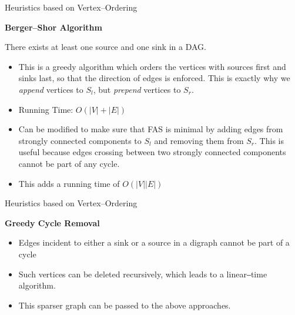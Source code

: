 \documentclass{beamer}
\begin{document}
\begin{frame}{Heuristics based on Vertex–Ordering}
    
    \textbf{Berger–Shor Algorithm}

    \begin{theorem}
        
        There exists at least one source and one sink in a DAG.

    \end{theorem}

    \begin{itemize}
        
        \item This is a greedy algorithm which orders the vertices with sources first and sinks last, so that the direction of edges is enforced. This is exactly why we \textit{append} vertices to $S_l$, but \textit{prepend} vertices to $S_r$.
        \item Running Time: $O(|V| + |E|)$
        \item Can be modified to make sure that FAS is minimal by adding edges from strongly connected components to $S_l$ and removing them from $S_r$. This is useful because edges crossing between two strongly connected components cannot be part of any cycle.
        \item This adds a running time of $O(|V||E|)$

    \end{itemize}

\end{frame}


\begin{frame}{Heuristics based on Vertex–Ordering}

    \textbf{Greedy Cycle Removal}

    \begin{itemize}
        
        \item Edges incident to either a sink or a source in a digraph cannot be part of a cycle

        \item Such vertices can be deleted recursively, which leads to a linear‒time algorithm.

        \item This sparser graph can be passed to the above approaches.

    \end{itemize}
    
\end{frame}
\end{document}
